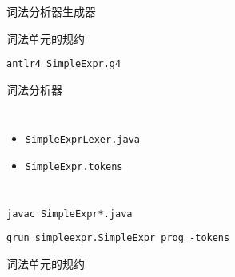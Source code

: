 
\begin{frame}{}
  \begin{center}
    词法分析器生成器
  \end{center}
\end{frame}

\begin{frame}{}
  \begin{center}
     词法单元的规约

    \vspace{0.50cm}
    \texttt{antlr4 SimpleExpr.g4}

    \pause
    \vspace{1.00cm}
     词法分析器

    \begin{columns}
        \begin{itemize}
          \setlength{\itemsep}{8pt}
          \item \texttt{SimpleExprLexer.java}
          \item \texttt{SimpleExpr.tokens}
        \end{itemize}
    \end{columns}

    \pause
    \vspace{1.00cm}
    \texttt{javac SimpleExpr*.java}

    \vspace{0.20cm}
    \texttt{grun simpleexpr.SimpleExpr prog -tokens}
  \end{center}
\end{frame}

\begin{frame}{}
  \begin{center}
    词法单元的规约

    \vspace{0.40cm}
    \begin{columns}
    \end{columns}

    \vspace{0.60cm}
  \end{center}
\end{frame}

